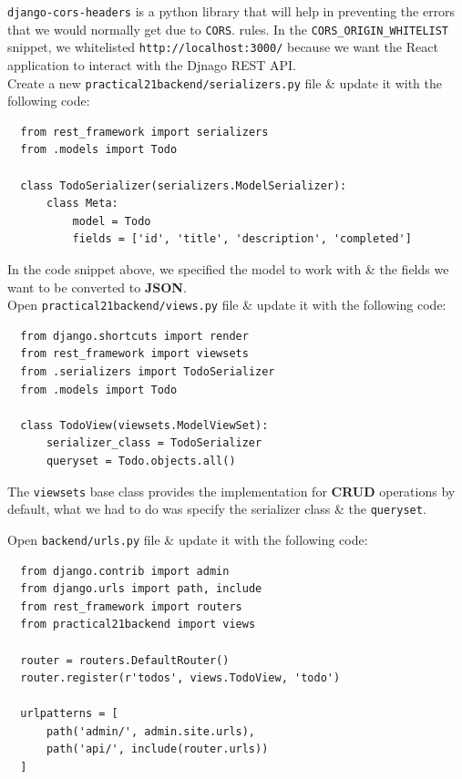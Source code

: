 \documentclass{article}
\begin{document}
\texttt{django-cors-headers} is a python library that will help in preventing the errors that we would normally get due to \texttt{CORS}. rules. In the \texttt{CORS\_ORIGIN\_WHITELIST} snippet, we whitelisted \texttt{http://localhost:3000/} because we want the React application to interact with the Djnago REST API. \\

Create a new \texttt{practical21backend/serializers.py} file \& update it with the following code:

\begin{verbatim}
  from rest_framework import serializers
  from .models import Todo

  class TodoSerializer(serializers.ModelSerializer):
      class Meta:
          model = Todo
          fields = ['id', 'title', 'description', 'completed']
\end{verbatim}

In the code snippet above, we specified the model to work with \& the fields we want to be converted to \textbf{JSON}. \\

Open \texttt{practical21backend/views.py} file \& update it with the following code:

\begin{verbatim}
  from django.shortcuts import render
  from rest_framework import viewsets          
  from .serializers import TodoSerializer      
  from .models import Todo                     

  class TodoView(viewsets.ModelViewSet):       
      serializer_class = TodoSerializer          
      queryset = Todo.objects.all()              
\end{verbatim}

The \texttt{viewsets} base class provides the implementation for \textbf{CRUD} operations by default, what we had to do was specify the serializer class \& the \texttt{queryset}.

Open \texttt{backend/urls.py} file \& update it with the following code:

\begin{verbatim}
  from django.contrib import admin
  from django.urls import path, include                
  from rest_framework import routers                   
  from practical21backend import views                            

  router = routers.DefaultRouter()                  
  router.register(r'todos', views.TodoView, 'todo') 

  urlpatterns = [
      path('admin/', admin.site.urls),         
      path('api/', include(router.urls))               
  ]
\end{verbatim}
\end{document}

